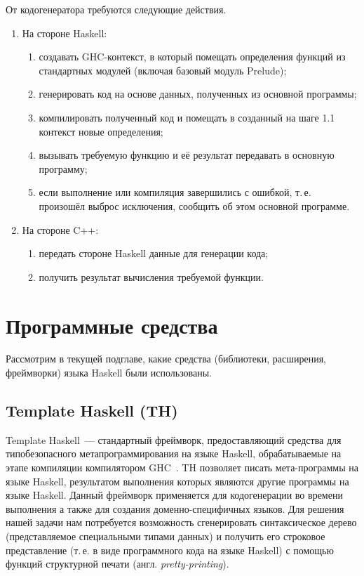 От кодогенератора требуются следующие действия.
\begin{enumerate}[1.]
	\item На стороне Haskell:
		\begin{enumerate}[1)]
			\item создавать GHC-контекст, в который помещать определения функций из стандартных модулей (включая базовый модуль Prelude);
			\item генерировать код на основе данных, полученных из основной программы;
			\item компилировать полученный код и помещать в созданный на шаге 1.1 контекст новые определения;
			\item вызывать требуемую функцию и её результат передавать в основную программу;
			\item если выполнение или компиляция завершились с ошибкой, т.\,е. произошёл выброс исключения, сообщить об этом основной программе.
		\end{enumerate}
	\item На стороне C++:
		\begin{enumerate}[1)]
			\item передать стороне Haskell данные для генерации кода;
			\item получить результат вычисления требуемой функции.
		\end{enumerate}
\end{enumerate}
\section{Программные средства}
Рассмотрим в текущей подглаве, какие средства (библиотеки, расширения, фреймворки) языка Haskell были использованы.

	\subsection{Template Haskell (TH)}\label{temphassec} Template Haskell~--- стандартный фреймворк, предоставляющий средства для типобезопасного метапрограммирования на языке Haskell, обрабатываемые на этапе компиляции компилятором GHC~\autocite{temphas}. TH позволяет писать мета-программы на языке Haskell, результатом выполнения которых являются другие программы на языке Haskell. Данный фреймворк применяется для кодогенерации во времени выполнения а также для создания доменно-специфичных языков. Для решения нашей задачи нам потребуется возможность сгенерировать синтаксическое дерево (представляемое специальными типами данных) и получить его строковое представление (т.\,е. в виде программного кода на языке Haskell) с помощью функций структурной печати (англ. \textit{pretty-printing}).
	
